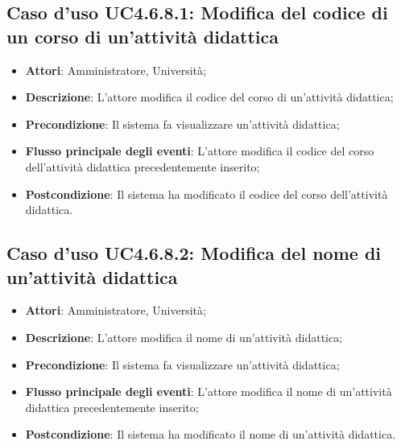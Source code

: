 \subsection{Caso d'uso \texorpdfstring{UC4.6.8.1}{UC4.6.8.1}: Modifica del codice di un corso di un'attività didattica}
\begin{itemize}
	\item \textbf{Attori}: Amministratore, Università;
	\item \textbf{Descrizione}: L'attore modifica il codice del corso di un'attività didattica;
	
	\item \textbf{Precondizione}: Il sistema fa visualizzare un'attività didattica;
	
	\item \textbf{Flusso principale degli eventi}: L'attore modifica il codice del corso dell’attività didattica precedentemente inserito;
	
	\item \textbf{Postcondizione}: Il sistema ha modificato il codice del corso dell’attività didattica.
	
\end{itemize}
\subsection{Caso d'uso \texorpdfstring{UC4.6.8.2}{UC4.6.8.2}: Modifica del nome di un'attività didattica}
\begin{itemize}
	\item \textbf{Attori}: Amministratore, Università;
	\item \textbf{Descrizione}: L'attore modifica il nome di un'attività didattica;
	
	\item \textbf{Precondizione}: Il sistema fa visualizzare un'attività didattica;
	
	
	\item \textbf{Flusso principale degli eventi}: L'attore modifica il nome di un'attività didattica precedentemente inserito;
	
	\item \textbf{Postcondizione}: Il sistema ha modificato il nome di un'attività didattica.
	
\end{itemize}
